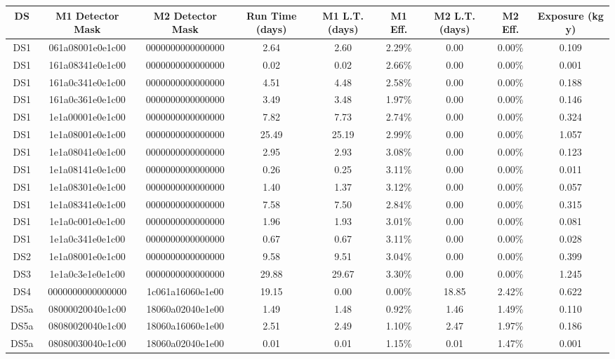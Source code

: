 \begin{tabular}{|c|c c|c|c c|c c|c|}
\hline
  DS & M1 Detector Mask & M2 Detector Mask & Run Time (days) & M1 L.T. (days) & M1 Eff. & M2 L.T. (days) & M2 Eff. & Exposure (kg y) \\
\hline
  DS1 & 061a08001e0e1c00 & 0000000000000000 & 2.64 & 2.60 & 2.29\% & 0.00 & 0.00\% & 0.109 \\
  DS1 & 161a08341e0e1c00 & 0000000000000000 & 0.02 & 0.02 & 2.66\% & 0.00 & 0.00\% & 0.001 \\
  DS1 & 161a0c341e0e1c00 & 0000000000000000 & 4.51 & 4.48 & 2.58\% & 0.00 & 0.00\% & 0.188 \\
  DS1 & 161a0c361e0e1c00 & 0000000000000000 & 3.49 & 3.48 & 1.97\% & 0.00 & 0.00\% & 0.146 \\
  DS1 & 1e1a00001e0e1c00 & 0000000000000000 & 7.82 & 7.73 & 2.74\% & 0.00 & 0.00\% & 0.324 \\
  DS1 & 1e1a08001e0e1c00 & 0000000000000000 & 25.49 & 25.19 & 2.99\% & 0.00 & 0.00\% & 1.057 \\
  DS1 & 1e1a08041e0e1c00 & 0000000000000000 & 2.95 & 2.93 & 3.08\% & 0.00 & 0.00\% & 0.123 \\
  DS1 & 1e1a08141e0e1c00 & 0000000000000000 & 0.26 & 0.25 & 3.11\% & 0.00 & 0.00\% & 0.011 \\
  DS1 & 1e1a08301e0e1c00 & 0000000000000000 & 1.40 & 1.37 & 3.12\% & 0.00 & 0.00\% & 0.057 \\
  DS1 & 1e1a08341e0e1c00 & 0000000000000000 & 7.58 & 7.50 & 2.84\% & 0.00 & 0.00\% & 0.315 \\
  DS1 & 1e1a0c001e0e1c00 & 0000000000000000 & 1.96 & 1.93 & 3.01\% & 0.00 & 0.00\% & 0.081 \\
  DS1 & 1e1a0c341e0e1c00 & 0000000000000000 & 0.67 & 0.67 & 3.11\% & 0.00 & 0.00\% & 0.028 \\
  DS2 & 1e1a08001e0e1c00 & 0000000000000000 & 9.58 & 9.51 & 3.04\% & 0.00 & 0.00\% & 0.399 \\
  DS3 & 1e1a0c3e1e0e1c00 & 0000000000000000 & 29.88 & 29.67 & 3.30\% & 0.00 & 0.00\% & 1.245 \\
  DS4 & 0000000000000000 & 1c061a16060e1e00 & 19.15 & 0.00 & 0.00\% & 18.85 & 2.42\% & 0.622 \\
  DS5a & 08000020040e1c00 & 18060a02040e1e00 & 1.49 & 1.48 & 0.92\% & 1.46 & 1.49\% & 0.110 \\
  DS5a & 08080020040e1c00 & 18060a16060e1e00 & 2.51 & 2.49 & 1.10\% & 2.47 & 1.97\% & 0.186 \\
  DS5a & 08080030040e1c00 & 18060a02040e1e00 & 0.01 & 0.01 & 1.15\% & 0.01 & 1.47\% & 0.001 \\

\end{tabular}
